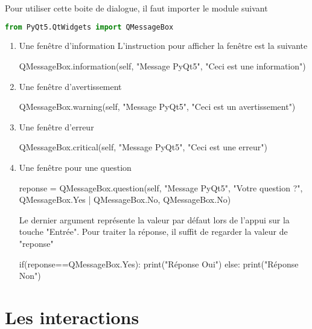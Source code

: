 Pour utiliser cette boite de dialogue, il faut importer le module suivant
\begin{lstlisting}[language=Python]
from PyQt5.QtWidgets import QMessageBox
\end{lstlisting}


\begin{enumerate}
    \item Une fenêtre d'information
    L'instruction pour afficher la fenêtre est la suivante
    \begin{Python}
    QMessageBox.information(self, "Message PyQt5", "Ceci est une information")
    \end{Python}
    \item Une fenêtre d'avertissement
    \begin{Python}
    QMessageBox.warning(self, "Message PyQt5", "Ceci est un avertissement")
    \end{Python}
    \item Une fenêtre d'erreur
    \begin{Python}
    QMessageBox.critical(self, "Message PyQt5", "Ceci est une erreur")
    \end{Python}
    \item Une fenêtre pour une question 
    \begin{Python}
    reponse = QMessageBox.question(self, "Message PyQt5", "Votre question ?", QMessageBox.Yes | QMessageBox.No, QMessageBox.No)
    \end{Python}
    Le dernier argument représente la valeur par défaut lors de l'appui sur la touche "Entrée". \newline
    Pour traiter la réponse, il suffit de regarder la valeur de "reponse"
    \begin{Python}
    if(reponse==QMessageBox.Yes):
        print("Réponse Oui")
    else:
        print("Réponse Non")
    \end{Python}
\end{enumerate}





\chapter{Les interactions}

